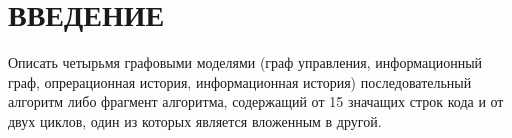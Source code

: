 \chapter*{ВВЕДЕНИЕ}

Описать четырьмя графовыми моделями (граф управления, информационный граф, опрерационная история, информационная история) последовательный алгоритм либо фрагмент алгоритма, содержащий от 15
значащих строк кода и от двух циклов, один из которых является вложенным в другой.